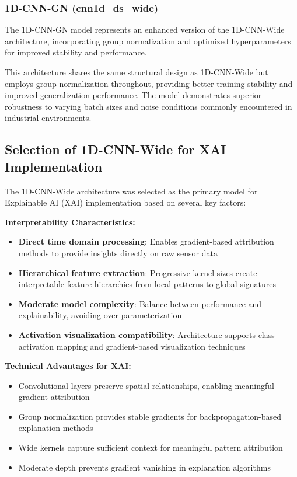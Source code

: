 \documentclass[12pt]{article}
\begin{document}
\subsubsection{1D-CNN-GN (cnn1d\_ds\_wide)}

The 1D-CNN-GN model represents an enhanced version of the 1D-CNN-Wide architecture, incorporating group normalization and optimized hyperparameters for improved stability and performance.

This architecture shares the same structural design as 1D-CNN-Wide but employs group normalization throughout, providing better training stability and improved generalization performance. The model demonstrates superior robustness to varying batch sizes and noise conditions commonly encountered in industrial environments.

\subsection{Selection of 1D-CNN-Wide for XAI Implementation}

The 1D-CNN-Wide architecture was selected as the primary model for Explainable AI (XAI) implementation based on several key factors:

\textbf{Interpretability Characteristics:}
\begin{itemize}
    \item \textbf{Direct time domain processing}: Enables gradient-based attribution methods to provide insights directly on raw sensor data
    \item \textbf{Hierarchical feature extraction}: Progressive kernel sizes create interpretable feature hierarchies from local patterns to global signatures
    \item \textbf{Moderate model complexity}: Balance between performance and explainability, avoiding over-parameterization
    \item \textbf{Activation visualization compatibility}: Architecture supports class activation mapping and gradient-based visualization techniques
\end{itemize}

\textbf{Technical Advantages for XAI:}
\begin{itemize}
    \item Convolutional layers preserve spatial relationships, enabling meaningful gradient attribution
    \item Group normalization provides stable gradients for backpropagation-based explanation methods
    \item Wide kernels capture sufficient context for meaningful pattern attribution
    \item Moderate depth prevents gradient vanishing in explanation algorithms
\end{itemize}
\end{document}
